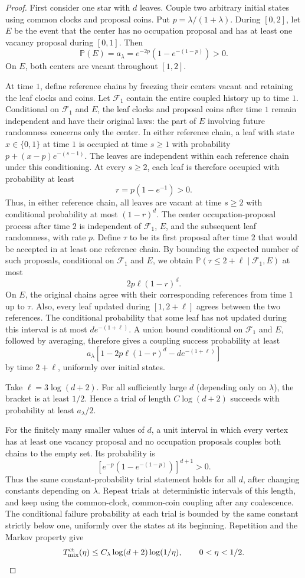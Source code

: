 \documentclass[11pt]{article}
\newcommand{\Prb}{\mathbb P}
\begin{document}
\begin{proof}
First consider one star with $d$ leaves. Couple two arbitrary initial states using common clocks and proposal coins. Put $p=\lambda/(1+\lambda)$. During $[0,2]$, let $E$ be the event that the center has no occupation proposal and has at least one vacancy proposal during $[0,1]$. Then
\[
\Prb(E)=a_\lambda=e^{-2p}(1-e^{-(1-p)})>0.
\]
On $E$, both centers are vacant throughout $[1,2]$.

At time $1$, define reference chains by freezing their centers vacant and retaining the leaf clocks and coins. Let $\mathcal F_1$ contain the entire coupled history up to time $1$. Conditional on $\mathcal F_1$ and $E$, the leaf clocks and proposal coins after time $1$ remain independent and have their original laws: the part of $E$ involving future randomness concerns only the center. In either reference chain, a leaf with state $x\in\{0,1\}$ at time $1$ is occupied at time $s\ge1$ with probability $p+(x-p)e^{-(s-1)}$. The leaves are independent within each reference chain under this conditioning. At every $s\ge2$, each leaf is therefore occupied with probability at least
\[
r=p(1-e^{-1})>0.
\]
Thus, in either reference chain, all leaves are vacant at time $s\ge2$ with conditional probability at most $(1-r)^d$. The center occupation-proposal process after time $2$ is independent of $\mathcal F_1$, $E$, and the subsequent leaf randomness, with rate $p$. Define $\tau$ to be its first proposal after time $2$ that would be accepted in at least one reference chain. By bounding the expected number of such proposals, conditional on $\mathcal F_1$ and $E$, we obtain $\Prb(\tau\le2+\ell\mid\mathcal F_1,E)$ at most
\[
2p\ell(1-r)^d.
\]
On $E$, the original chains agree with their corresponding references from time $1$ up to $\tau$. Also, every leaf updated during $[1,2+\ell]$ agrees between the two references. The conditional probability that some leaf has not updated during this interval is at most $de^{-(1+\ell)}$. A union bound conditional on $\mathcal F_1$ and $E$, followed by averaging, therefore gives a coupling success probability at least
\[
a_\lambda\left[1-2p\ell(1-r)^d-de^{-(1+\ell)}\right]
\]
by time $2+\ell$, uniformly over initial states.

Take $\ell=3\log(d+2)$. For all sufficiently large $d$ (depending only on $\lambda$), the bracket is at least $1/2$. Hence a trial of length $C\log(d+2)$ succeeds with probability at least $a_\lambda/2$.

For the finitely many smaller values of $d$, a unit interval in which every vertex has at least one vacancy proposal and no occupation proposals couples both chains to the empty set. Its probability is
\[
\left[e^{-p}(1-e^{-(1-p)})\right]^{d+1}>0.
\]
Thus the same constant-probability trial statement holds for all $d$, after changing constants depending on $\lambda$. Repeat trials at deterministic intervals of this length, and keep using the common-clock, common-coin coupling after any coalescence. The conditional failure probability at each trial is bounded by the same constant strictly below one, uniformly over the states at its beginning. Repetition and the Markov property give
\[
T_{\rm mix}^{\rm ct}(\eta)\le C_\lambda\log(d+2)\log(1/\eta),
\qquad 0<\eta<1/2.
\]


\end{proof}
\end{document}
